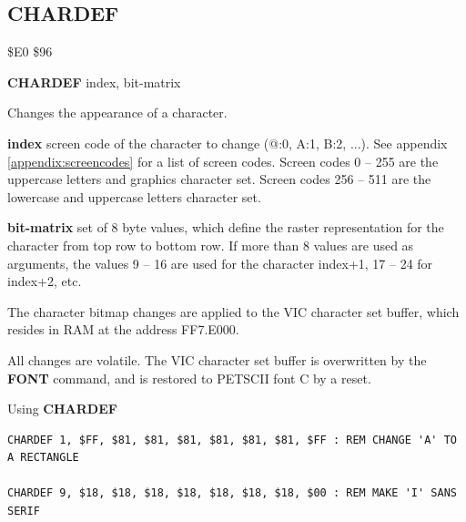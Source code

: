 \subsection{CHARDEF}
\begin{description}[leftmargin=2cm,style=nextline]
\item [Token:]   \$E0 \$96

\item [Format:]  {\bf CHARDEF} index, bit-matrix

\item [Usage:]   Changes the appearance of a character.

                 {\bf index} screen code of the character to change (@:0, A:1, B:2, ...). See appendix \vref{appendix:screencodes} for a list of screen codes. Screen codes 0 -- 255 are the uppercase letters and graphics character set. Screen codes 256 -- 511 are the lowercase and uppercase letters character set.

                 {\bf bit-matrix} set of 8 byte values, which define the raster representation for the character from top row to bottom row. If more than 8 values are used as arguments, the values 9 -- 16 are used for the character index+1, 17 -- 24 for index+2, etc.

\item [Remarks:] The character bitmap changes are applied to the VIC character set buffer, which resides in RAM at the address FF7.E000.

                 All changes are volatile. The VIC character set buffer is overwritten by the {\bf FONT} command, and is restored to PETSCII font C by a reset.

\item [Examples:] Using {\bf CHARDEF}

\begin{tcolorbox}[colback=black,coltext=white]
\verbatimfont{\codefont}
\begin{verbatim}
CHARDEF 1, $FF, $81, $81, $81, $81, $81, $81, $FF : REM CHANGE 'A' TO A RECTANGLE

CHARDEF 9, $18, $18, $18, $18, $18, $18, $18, $00 : REM MAKE 'I' SANS SERIF
\end{verbatim}
\end{tcolorbox}
\end{description}


\newpage
